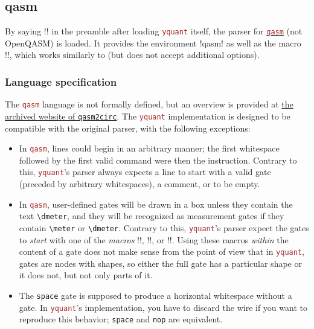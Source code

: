 \documentclass{scrartcl}
\def\pkg#1{\textcolor{brown}{\texttt{#1}}}
\def\langlink#1{\hyperref[sec:foreign:#1]{\pkg{#1}}}
\def\texlink{\link\tex}
\def\Yquant{\pkg{yquant}}
\begin{document}
      \subsection{qasm}\label{sec:foreign:qasm}
         By saying \tex!! in the preamble after loading \Yquant{} itself, the parser for \langlink{qasm} (not OpenQASM) is loaded.
         \linkdef\qasmimport
         It provides the environment \tex!qasm! as well as the macro \tex!\qasmimport!, which works similarly to \texlink{\yquantimport} (but does not accept additional options).

         \subsubsection{Language specification}
            The \pkg{qasm} language is not formally defined, but an overview is provided at \href{https://web.archive.org/web/20050410022847/https://www.media.mit.edu/quanta/qasm2circ/#spec}{the archived website of \texttt{qasm2circ}}.
            The \Yquant{} implementation is designed to be compatible with the original parser, with the following exceptions:
            \begin{itemize}
               \item In \pkg{qasm}, lines could begin in an arbitrary manner; the first whitespace followed by the first valid command were then the instruction.
                  Contrary to this, \Yquant's parser always expects a line to start with a valid gate (preceded by arbitrary whitespaces), a comment, or to be empty.
               \item {}
                  In \pkg{qasm}, user\hyp defined gates will be drawn in a box unless they contain the text \texttt{\textbackslash dmeter}, and they will be recognized as measurement gates if they contain \texttt{\textbackslash meter} or \texttt{\textbackslash dmeter}.
                  Contrary to this, \Yquant's parser expect the gates to \emph{start} with one of the \emph{macros} \tex!\meter!, \tex!\dmeter!, or \tex!\dmeterwide!.
                  Using these macros \emph{within} the content of a gate does not make sense from the point of view that in \Yquant, gates are nodes with shapes, so either the full gate has a particular shape or it does not, but not only parts of it.
               \item {}
                  The \texttt{space} gate is supposed to produce a horizontal whitespace without a gate.
                  In \Yquant's implementation, you have to discard the wire if you want to reproduce this behavior; \texttt{space} and \texttt{nop} are equivalent.
            \end{itemize}
\end{document}
